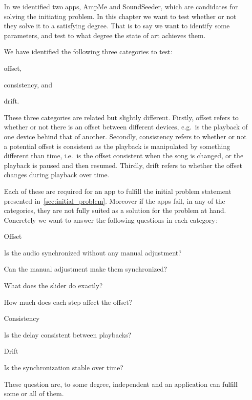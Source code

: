 In  we identified two apps, AmpMe and SoundSeeder, which are candidates for solving the initiating problem.
In this chapter we want to test whether or not they solve it to a satisfying degree.
That is to say we want to identify some parameters, and test to what degree the state of art achieves them.

We have identified the following three categories to test:
\begin{eletterate*}
    \item offset,
    \item consistency, and
    \item drift.
\end{eletterate*}

These three categories are related but slightly different.
Firstly, offset refers to whether or not there is an offset between different devices, e.g.\ is the playback of one device behind that of another.
Secondly, consistency refers to whether or not a potential offset is consistent as the playback is manipulated by something different than time, i.e.\ is the offset consistent when the song is changed, or the playback is paused and then resumed.
Thirdly, drift refers to whether the offset changes during playback over time.

Each of these are required for an app to fulfill the initial problem statement presented in~\cref{sec:initial_problem}.
Moreover if the apps fail, in any of the categories, they are not fully suited as a solution for the problem at hand.
Concretely we want to answer the following questions in each category:
\begin{eletterate}
    \item Offset
    \begin{enumberate}
        \item Is the audio synchronized without any manual adjustment?
        \item Can the manual adjustment make them synchronized?
        \begin{enumberate}
            \item What does the slider do exactly?
            \item How much does each step affect the offset?
        \end{enumberate}
    \end{enumberate}
    \item Consistency
    \begin{enumberate}[resume]
        \item Is the delay consistent between playbacks?
    \end{enumberate}
    \item Drift
    \begin{enumberate}[resume]
        \item Is the synchronization stable over time?
    \end{enumberate}
\end{eletterate}

These question are, to some degree, independent and an application can fulfill some or all of them.

